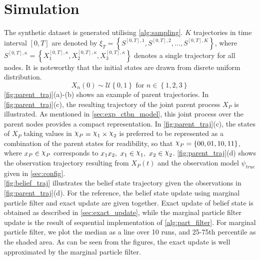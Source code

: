 \section{Simulation}
\label{sec:simulation}
The synthetic dataset is generated utilising \cref{alg:sampling}. $ K $ trajectories in time interval $ [0, T] $ are denoted by $ \xi_T = \left\lbrace S^{[0,T], 1}, S^{[0,T], 2}, ..., S^{[0,T], K} \right\rbrace  $, where $ S^{[0,T],\kappa} = \left\lbrace X_1^{[0,T],\kappa} , X_2^{[0,T],\kappa}, X_3^{[0,T],\kappa}\right\rbrace $ denotes a single trajectory for all nodes. It is noteworthy that the initial states are drawn from disrete uniform distribution.
\begin{equation}
X_n(0) \sim \mathcal{U} \left\lbrace 0, 1\right\rbrace  \text{ for } n \in \left\lbrace 1,2,3\right\rbrace 
\end{equation}
\autoref{fig:parent_traj}(a)-(b) shows an example of parent trajectories. In \autoref{fig:parent_traj}(c), the resulting trajectory of the joint parent process $ X_P $ is illustrated. As mentioned in \cref{sec:exp_ctbn_model}, this joint process over the parent nodes provides a compact representation. In \autoref{fig:parent_traj}(c), the states of $ X_P $ taking values in $ \rchi_P = \rchi_1 \times \rchi_2 $ is preferred to be represented as a combination of the parent states for readibility, so that $ \rchi_P = \left\lbrace 00, 01, 10, 11\right\rbrace  $, where $ x_P \in \rchi_P $ corresponds to $ x_1x_2,\ x_1\in \rchi_1,\  x_2\in \rchi_2 $. \autoref{fig:parent_traj}(d) shows the observation trajectory resulting from $ X_P(t) $ and the observation model $ \psi_{true} $ given in \cref{sec:config}. \\
\autoref{fig:belief_traj} illustrates the belief state trajectory given the observations in \autoref{fig:parent_traj}(d). For the reference, the belief state update using marginal particle filter and exact update are given together. Exact update of belief state is obtained as described in \cref{sec:exact_update}, while the marginal particle filter update is the result of sequential implementation of \cref{alg:part_filter}. For marginal particle filter, we plot the median as a line over 10 runs, and 25-75th percentile as the shaded area. As can be seen from the figures, the exact update is well approximated by the marginal particle filter.
